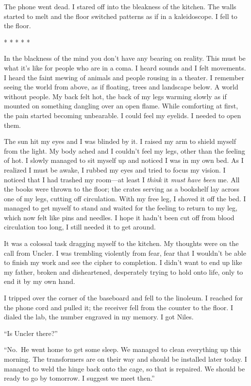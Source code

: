 \documentclass[
]{article}
\begin{document}
The phone went dead. I stared off into the bleakness of the kitchen. The
walls started to melt and the floor switched patterns as if in a
kaleidoscope. I fell to the floor.

* * * * *

In the blackness of the mind you don't have any bearing on reality. This
must be what it's like for people who are in a coma. I heard sounds and
I felt movements. I heard the faint mewing of animals and people rousing
in a theater. I remember seeing the world from above, as if floating,
trees and landscape below. A world without people. My back felt hot, the
back of my legs warming slowly as if mounted on something dangling over
an open flame. While comforting at first, the pain started becoming
unbearable. I could feel my eyelids. I needed to open them.

The sun hit my eyes and I was blinded by it. I raised my arm to shield
myself from the light. My body ached and I couldn't feel my legs, other
than the feeling of hot. I slowly managed to sit myself up and noticed I
was in my own bed. As I realized I must be awake, I rubbed my eyes and
tried to focus my vision. I noticed that I had trashed my room---at
least I \emph{think} it \emph{must have been} me. All the books were
thrown to the floor; the crates serving as a bookshelf lay across one of
my legs, cutting off circulation. With my free leg, I shoved it off the
bed. I managed to get myself to stand and waited for the feeling to
return to my leg, which now felt like pins and needles. I hope it hadn't
been cut off from blood circulation too long, I still needed it to get
around.

It was a colossal task dragging myself to the kitchen. My thoughts were
on the call from Uncler. I was trembling violently from fear, fear that
I wouldn't be able to finish my work and see the cipher to completion. I
didn't want to end up like my father, broken and disheartened,
desperately trying to hold onto life, only to end it by my own hand.

I tripped over the corner of the baseboard and fell to the linoleum. I
reached for the phone cord and pulled it; the receiver fell from the
counter to the floor. I dialed the lab, the number engraved in my
memory. I got Niles.

``Is Uncler there?''

``No.~He went home to get some sleep. We managed to clean everything up
this morning. The transformers are on their way and should be installed
later today. I managed to weld the hinge back onto the cage, so that is
repaired. We should be ready to go by tomorrow. I suggest we meet
then.''
\end{document}
